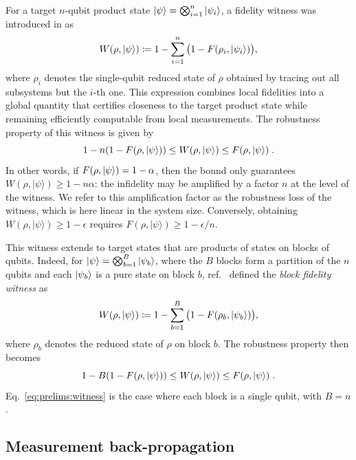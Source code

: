 \documentclass[a4paper,twocolumn,11pt,unpublished]{../../revision/quantumarticle}
\begin{document}
For a target $n$-qubit product state $\ket{\psi}=\bigotimes_{i=1}^n\ket{\psi_i}$, a fidelity witness was introduced in \cite{CGKM21efficient} as
\begin{equation}
    \label{eq:prelims:witness}
    W(\rho, \ket{\psi}) 
    \coloneqq 1 - 
    \sum_{i=1}^{n}
    \big(1 - F(\rho_i, \ket{\psi_i})\big),
\end{equation}
where $\rho_i$ denotes the single-qubit reduced state of $\rho$ obtained by tracing out all subsystems but the $i$-th one.
This expression combines local fidelities into a global quantity that certifies closeness to the target product state while remaining efficiently computable from local measurements. The {robustness} property of this witness is given by \cite{CGKM21efficient}
\begin{equation}
    \label{eq:prelims:witness:robustness}
    1-n(1-F(\rho, \ket\psi)) \leq W(\rho, \ket\psi)\leq F(\rho, \ket\psi)\; .
\end{equation}
In other words, if $F(\rho,\ket\psi)=1-\alpha$, then the bound only guarantees $W(\rho,|\psi\rangle)\geq 1-n\alpha$: the infidelity may be amplified by a factor $n$ at the level of the witness. We refer to this amplification factor as the robustness loss of the witness, which is here linear in the system size. Conversely, obtaining $W(\rho,|\psi\rangle)\geq 1-\epsilon$ requires $F(\rho,|\psi\rangle)\geq 1-\epsilon/n$.

This witness extends to target states that are products of states on blocks of qubits. Indeed,
for $\ket{\psi}=\bigotimes_{b=1}^{B}\ket{\psi_b}$, where the $B$ blocks form a partition of the $n$ qubits and each $\ket{\psi_b}$ is a pure state on block $b$, ref.~\cite{UC24efficient} defined the \emph{block fidelity witness} as
\begin{equation}
    \label{eq:prelims:blockwitness}
    W(\rho, \ket{\psi})
    \coloneqq 1 -
    \sum_{b=1}^{B}
    \big(1 - F(\rho_b, \ket{\psi_b})\big),
\end{equation}
where $\rho_b$ denotes the reduced state of $\rho$ on block $b$. The robustness property then becomes
\begin{equation}
    \label{eq:prelims:blockwitness:robustness}
    1-B(1-F(\rho, \ket\psi)) \leq W(\rho, \ket\psi)\leq F(\rho, \ket\psi)\; .
\end{equation}
Eq.~\eqref{eq:prelims:witness} is the case where each block is a single qubit, with $B=n$.


\subsection{Measurement back-propagation}
\label{subsection:prelims:backprop}
\end{document}
